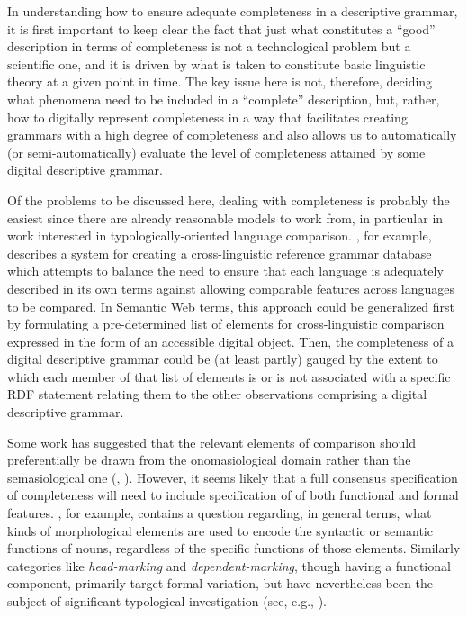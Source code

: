 In understanding how to ensure adequate completeness in a descriptive grammar,
it is first important to keep clear the fact that just what constitutes a
``good'' description in terms of completeness is not a technological problem but
a scientific one, and it is driven by what is taken to constitute basic
linguistic theory \citep{Dryer:2006} at a given point in time. The key issue here
is not, therefore, deciding what phenomena need to be included in a ``complete''
description, but, rather, how to digitally represent completeness in a way that
facilitates creating grammars with a high degree of completeness and also allows
us to automatically (or semi-automatically) evaluate the level of completeness
attained by some digital descriptive grammar.

Of the problems to be discussed here, dealing with completeness is probably the
easiest since there are already reasonable models to work from, in particular in
work interested in typologically-oriented language comparison.
, for example, describes a system for creating a
cross-linguistic reference grammar database which attempts to balance the need
to ensure that each language is adequately described in its own terms against
allowing comparable features across languages to be compared. In Semantic Web
terms, this approach could be generalized first by formulating a pre-determined
list of elements for cross-linguistic comparison expressed in the form of an
accessible digital object. Then, the completeness of a digital descriptive
grammar could be (at least partly) gauged by the extent to which each member of
that list of elements is or is not associated with a specific RDF statement
relating them to the other observations comprising a digital descriptive
grammar.

Some work has suggested that the relevant elements of comparison should
preferentially be drawn from the onomasiological domain rather than the
semasiological one (,
). However, it seems likely that a full
consensus specification of completeness will need to include specification of of
both functional and formal features. , for
example, contains a question regarding, in general terms, what kinds of
morphological elements are used to encode the syntactic or semantic functions of
nouns, regardless of the specific functions of those elements. Similarly
categories like \emph{head-marking} and \emph{dependent-marking}, though having
a functional component, primarily target formal variation, but have nevertheless
been the subject of significant typological investigation (see, e.g.,
).

